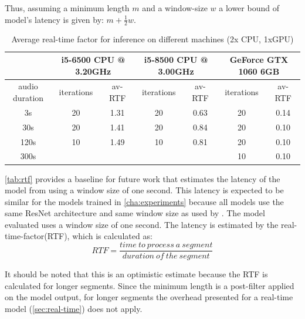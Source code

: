 \documentclass[bsc,frontabs,parskip,deptreport]{infthesis}
\begin{document}
Thus, assuming a minimum length $m$ and a window-size $w$ a lower bound of model's latency is given by: $m + \frac{1}{2}w$.

\begin{table}[h!]
    \hspace{-2cm}
    \begin{tabular}{|c|c|c|c|c|c|c|}
    \hline
    & \multicolumn{2}{|c|}{i5-6500 CPU @ 3.20GHz} &
    \multicolumn{2}{|c|}{i5-8500 CPU @ 3.00GHz} & 
    \multicolumn{2}{|c|}{GeForce GTX 1060 6GB} \\ 
    \hline
    audio duration & iterations & av-RTF &
    iterations & av-RTF & iterations & av-RTF \\
    \hline
    3s & 20 & 1.31   & 20 & 0.63  & 20 & 0.14  \\
    30s & 20 & 1.41  & 20 & 0.84  & 20 & 0.10 \\
    120s & 10 & 1.49 &  10 & 0.81  & 20 & 0.10 \\
    300s &&&&                     & 10 & 0.10 \\
    \hline
    \end{tabular}
    \caption{Average real-time factor for inference on different machines (2x CPU, 1xGPU)}
    \label{tab:rtf}
\end{table}

\autoref{tab:rtf} provides a baseline for future work that estimates the latency of the model from \citet{gillick2021robust} using a window size of one second. This latency is expected to be similar for the models trained in \autoref{cha:experiments} because all models use the same ResNet architecture and same window size as used by \citet{gillick2021robust}. 
The model evaluated uses a window size of one second. 
The latency is estimated by the real-time-factor(RTF), which is calculated as: 
$$ RTF = \frac{time\ to\ process\ a\ segment}{duration\ of\ the\ segment} $$

It should be noted that this is an optimistic estimate because the RTF is calculated for longer segments.
Since the minimum length is a post-filter applied on the model output, for longer segments the overhead presented for a real-time model (\autoref{sec:real-time}) does not apply. 
\end{document}
